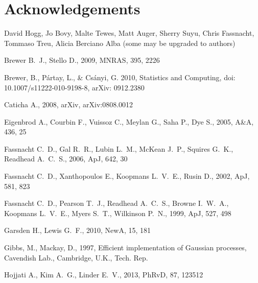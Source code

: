 \documentclass[useAMS,usenatbib, a4paper]{mn2e} \usepackage{natbib}
\begin{document}

\section{Acknowledgements}
David Hogg, Jo Bovy, Malte Tewes, Matt Auger, Sherry Suyu, Chris Fassnacht, Tommaso Treu, Alicia Berciano Alba
(some may be upgraded to authors)


\begin{thebibliography}{99} 
 Brewer B.~J., Stello D., 2009, MNRAS, 395, 2226

Brewer, B., P\'{a}rtay, L., \& Cs\'{a}nyi, G. 2010, Statistics and Computing, doi: 10.1007/s11222-010-9198-8, arXiv: 0912.2380

Caticha A., 2008, arXiv, arXiv:0808.0012 

 Eigenbrod A., Courbin F., Vuissoz C., Meylan G., Saha P., Dye S., 2005, A\&A, 436, 25 

 Fassnacht C.~D., Gal R.~R., Lubin L.~M., 
McKean J.~P., Squires G.~K., Readhead A.~C.~S., 2006, ApJ, 642, 30 

 Fassnacht C.~D., Xanthopoulos E., Koopmans 
L.~V.~E., Rusin D., 2002, ApJ, 581, 823 

 Fassnacht C.~D., Pearson T.~J., Readhead 
A.~C.~S., Browne I.~W.~A., Koopmans L.~V.~E., Myers S.~T., Wilkinson P.~N., 
1999, ApJ, 527, 498 

 Garsden H., Lewis G.~F., 2010, NewA, 15, 181 

Gibbs, M., Mackay, D., 1997, Efficient implementation of Gaussian processes, Cavendish Lab., Cambridge, U.K., Tech. Rep.

 Hojjati A., Kim A.~G., Linder E.~V., 2013, PhRvD, 87, 123512 


\end{thebibliography}
\end{document}
